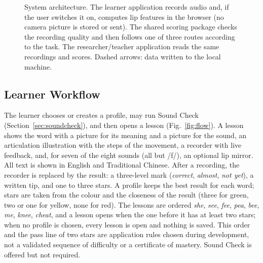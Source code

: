 \documentclass[conference]{IEEEtran}
\newcommand{\ipa}[1]{/#1/}
\begin{document}
\begin{figure}[!t]
{}
\caption{System architecture. The learner application records audio and, if the user switches it on, computes lip features in the browser (no camera picture is stored or sent). The shared scoring package checks the recording quality and then follows one of three routes according to the task. The researcher/teacher application reads the same recordings and scores. Dashed arrows: data written to the local machine.}
\label{fig:arch}
\end{figure}

\subsection{Learner Workflow}
The learner chooses or creates a profile, may run Sound Check (Section~\ref{sec:soundcheck}), and then opens a lesson (Fig.~\ref{fig:flow}). A lesson shows the word with a picture for its meaning and a picture for the sound, an articulation illustration with the steps of the movement, a recorder with live feedback, and, for seven of the eight sounds (all but \ipa{f}), an optional lip mirror. All text is shown in English and Traditional Chinese. After a recording, the recorder is replaced by the result: a three-level mark (\textit{correct}, \textit{almost}, \textit{not yet}), a written tip, and one to three stars. A profile keeps the best result for each word; stars are taken from the colour and the closeness of the result (three for green, two or one for yellow, none for red). The lessons are ordered \textit{she}, \textit{see}, \textit{fee}, \textit{pea}, \textit{bee}, \textit{me}, \textit{knee}, \textit{cheat}, and a lesson opens when the one before it has at least two stars; when no profile is chosen, every lesson is open and nothing is saved. This order and the pass line of two stars are application rules chosen during development, not a validated sequence of difficulty or a certificate of mastery. Sound Check is offered but not required.
\end{document}
